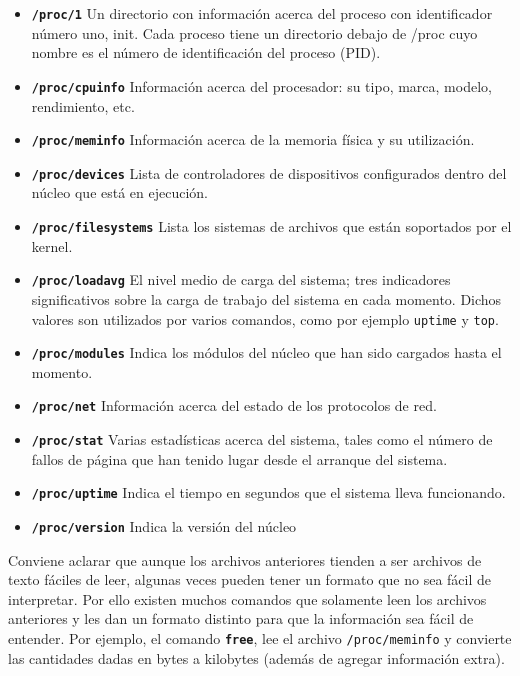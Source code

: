 \documentclass[12pt]{article}
\begin{document}
	\begin{itemize} 
	
	\item
	\textbf{\texttt{/proc/1}}
	 Un directorio con información acerca del proceso con identificador
	número uno, init. Cada proceso tiene un directorio debajo de /proc 
        cuyo nombre es el número de identificación del proceso (PID).  
	
	
	\item
	\textbf{\texttt{/proc/cpuinfo}}
	 Información acerca del procesador: su tipo, marca,
	modelo,	rendimiento, etc.  
	
	\item \textbf{\texttt{/proc/meminfo}}
	 Información acerca de la memoria
	física y su utilización. 
	
	\item
	\textbf{\texttt{/proc/devices}}
	 Lista de controladores de dispositivos configurados
	dentro 	del núcleo que está en ejecución.
	
	\item
	\textbf{\texttt{/proc/filesystems}}
	 Lista los sistemas de archivos que están soportados por
	el kernel.  
	
	
	\item \textbf{\texttt{/proc/loadavg}}
	 El nivel medio de carga del sistema; tres indicadores
	significativos sobre la carga de trabajo del sistema en cada
	momento. Dichos valores son utilizados por varios comandos, como por 
	ejemplo \texttt{uptime} y \texttt{top}. 
	
	
	\item
	\textbf{\texttt{/proc/modules}}
	 Indica los módulos del núcleo que han sido cargados
	hasta el momento.
	

	\item \textbf{\texttt{/proc/net}}         
	 Información acerca del estado de los protocolos de
	red.
	
	\item \textbf{\texttt{/proc/stat}}
	 Varias estadísticas acerca del sistema, tales como el
	número de fallos de página que han tenido lugar desde el arranque del
	sistema.
	
	\item \textbf{\texttt{/proc/uptime}}
	 Indica el tiempo en segundos que el sistema lleva
	funcionando.
	
	\item \textbf{\texttt{/proc/version}}
	 Indica la versión del núcleo
	
	
	 \end{itemize} 

    Conviene aclarar que aunque los archivos anteriores tienden a ser
    archivos de texto fáciles de leer, algunas veces pueden tener un formato
    que no sea fácil de interpretar. Por ello existen muchos comandos que
    solamente leen los archivos anteriores y les dan un formato distinto para
    que la información sea fácil de entender. Por ejemplo, el comando
    \texttt{\textbf{free}}, lee el archivo \texttt{/proc/meminfo}
    y convierte las cantidades dadas en bytes a kilobytes (además de agregar 
    información extra). 

\end{document}
